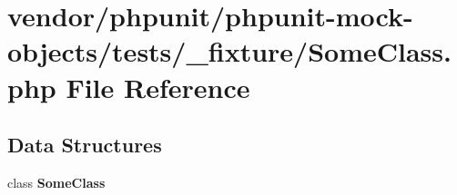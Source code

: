 \section{vendor/phpunit/phpunit-\/mock-\/objects/tests/\+\_\+fixture/\+Some\+Class.php File Reference}
\label{_some_class_8php}
\subsection*{Data Structures}
\begin{DoxyCompactItemize}
\item 
class {\bf Some\+Class}
\end{DoxyCompactItemize}
